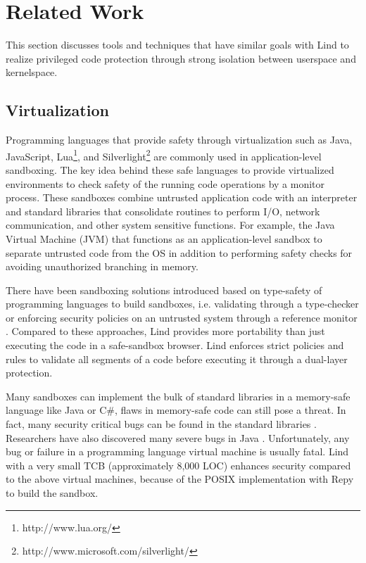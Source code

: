 \section{Related Work}
\label{sec.related_work}

This section discusses tools and techniques that have similar goals with Lind to realize privileged code protection through strong isolation between userspace and kernelspace.
	
\subsection{Virtualization}

Programming languages that provide safety through virtualization such as Java, JavaScript, Lua\footnote{http://www.lua.org/}, and Silverlight\footnote{http://www.microsoft.com/silverlight/} are commonly used in application-level sandboxing. The key idea behind these safe languages to provide virtualized environments to check safety of the running code operations by a monitor process. These sandboxes combine untrusted application code with an interpreter and standard libraries that consolidate routines to perform I/O, network communication, and other system sensitive functions. For example, the Java Virtual Machine (JVM) \cite{JVM} that functions as an application-level sandbox to separate untrusted code from the OS in addition to performing safety checks for avoiding unauthorized branching in memory. 

There have been sandboxing solutions introduced based on type-safety of programming languages to build sandboxes, i.e. validating through a type-checker \cite{JS-Sandboxing} or enforcing security policies on an untrusted system through a reference monitor \cite{JS-Sandboxing1}. Compared to these approaches, Lind provides more portability than just executing the code in a safe-sandbox browser. Lind enforces strict policies and rules to validate all segments of a code before executing it through a dual-layer protection.

Many sandboxes can implement the bulk of standard libraries in a memory-safe language like Java or C\#, flaws in memory-safe code can still pose a threat. In fact, many security critical bugs can be found in the standard libraries \cite{JavaBugs}. Researchers have also discovered many severe bugs in Java \cite{Java-Lessons}. Unfortunately, any bug or failure in a programming language virtual machine is usually fatal. Lind with a very small TCB (approximately 8,000 LOC) enhances security compared to the above virtual machines, because of the POSIX implementation with Repy to build the sandbox.

